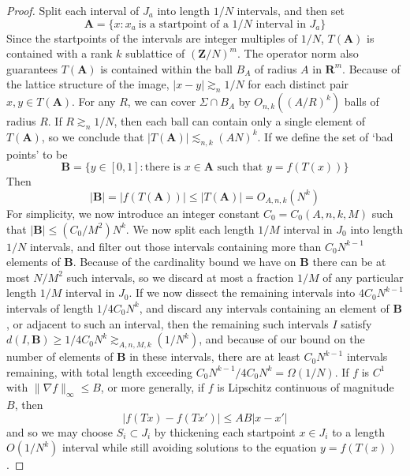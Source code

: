 \documentclass{report}
\theoremstyle{plain}
\theoremstyle{plain}
\begin{document}
\begin{proof}
Split each interval of $J_a$ into length $1/N$ intervals, and then set
%
\[ \mathbf{A} = \{ x : x_a\ \text{is a startpoint of a $1/N$ interval in $J_a$} \} \]
%
Since the startpoints of the intervals are integer multiples of $1/N$, $T(\mathbf{A})$ is contained with a rank $k$ sublattice of $(\mathbf{Z}/N)^m$. The operator norm also guarantees $T(\mathbf{A})$ is contained within the ball $B_A$ of radius $A$ in $\mathbf{R}^m$. Because of the lattice structure of the image, $| x - y | \gtrsim_n 1/N$ for each distinct pair $x,y \in T(\mathbf{A})$. For any $R$, we can cover $\Sigma \cap B_A$ by $O_{n,k}((A/R)^k)$ balls of radius $R$. If $R \gtrsim_n 1/N$, then each ball can contain only a single element of $T(\mathbf{A})$, so we conclude that $|T(\mathbf{A})| \lesssim_{n,k} (AN)^k$. If we define the set of `bad points' to be
%
\[ \mathbf{B} = \{ y \in [0,1] : \text{there is $x \in \mathbf{A}$ such that $y = f(T(x))$} \} \]
%
Then
%
\[ |\mathbf{B}| = |f(T(\mathbf{A}))| \leq |T(\mathbf{A})| = O_{A,n,k}(N^k) \]
%
For simplicity, we now introduce an integer constant $C_0 = C_0(A,n,k,M)$ such that $|\mathbf{B}| \leq (C_0/M^2) N^k$. We now split each length $1/M$ interval in $J_0$ into length $1/N$ intervals, and filter out those intervals containing more than $C_0N^{k-1}$ elements of $\mathbf{B}$. Because of the cardinality bound we have on $\mathbf{B}$ there can be at most $N/M^2$ such intervals, so we discard at most a fraction $1/M$ of any particular length $1/M$ interval in $J_0$. If we now dissect the remaining intervals into $4C_0N^{k-1}$ intervals of length $1/4C_0N^k$, and discard any intervals containing an element of $\mathbf{B}$, or adjacent to such an interval, then the remaining such intervals $I$ satisfy $d(I,\mathbf{B}) \geq 1/4C_0N^k \gtrsim_{A,n,M,k}(1/N^k)$, and because of our bound on the number of elements of $\mathbf{B}$ in these intervals, there are at least $C_0N^{k-1}$ intervals remaining, with total length exceeding $C_0N^{k-1}/4C_0N^k = \Omega(1/N)$. If $f$ is $C^1$ with $\| \nabla f \|_\infty \leq B$, or more generally, if $f$ is Lipschitz continuous of magnitude $B$, then
%
\[ | f(Tx) - f(Tx')| \leq AB |x - x'| \]
%
and so we may choose $S_i \subset J_i$ by thickening each startpoint $x \in J_i$ to a length $O(1/N^k)$ interval while still avoiding solutions to the equation $y = f(T(x))$.
\end{proof}
\end{document}
